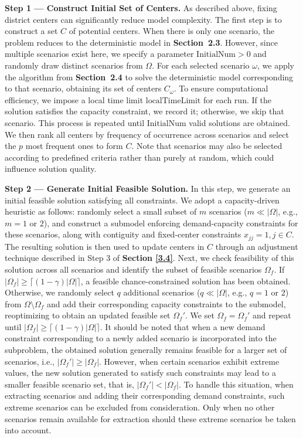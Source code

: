 \documentclass[preprint,12pt,authoryear]{elsarticle}
\begin{document}
\textbf{Step 1 — Construct Initial Set of Centers.}  
As described above, fixing district centers can significantly reduce model complexity. The first step is to construct a set $C$ of potential centers. When there is only one scenario, the problem reduces to the deterministic model in \textbf{Section~2.3}. However, since multiple scenarios exist here, we specify a parameter $\text{InitialNum} > 0$ and randomly draw distinct scenarios from $\Omega$. For each selected scenario $\omega$, we apply the algorithm from \textbf{Section~2.4} to solve the deterministic model corresponding to that scenario, obtaining its set of centers $C_\omega$. To ensure computational efficiency, we impose a local time limit $\text{localTimeLimit}$ for each run. If the solution satisfies the capacity constraint, we record it; otherwise, we skip that scenario. This process is repeated until $\text{InitialNum}$ valid solutions are obtained. We then rank all centers by frequency of occurrence across scenarios and select the $p$ most frequent ones to form $C$. Note that scenarios may also be selected according to predefined criteria rather than purely at random, which could influence solution quality.

\textbf{Step 2 — Generate Initial Feasible Solution.}  
In this step, we generate an initial feasible solution satisfying all constraints. We adopt a capacity-driven heuristic as follows: randomly select a small subset of $m$ scenarios ($m \ll |\Omega|$, e.g., $m=1$ or $2$), and construct a submodel enforcing demand-capacity constraints for these scenarios, along with contiguity and fixed-center constraints $x_{jj}=1, j\in C$. The resulting solution is then used to update centers in $C$ through an adjustment technique described in Step 3 of \textbf{Section \ref{3.4}}. Next, we check feasibility of this solution across all scenarios and identify the subset of feasible scenarios $\Omega_f$. If $|\Omega_f| \geqslant \lceil (1-\gamma)|\Omega| \rceil$, a feasible chance-constrained solution has been obtained. Otherwise, we randomly select $q$ additional scenarios ($q \ll |\Omega|$, e.g., $q=1$ or $2$) from $\Omega \setminus \Omega_f$ and add their corresponding capacity constraints to the submodel, reoptimizing to obtain an updated feasible set $\Omega_f'$. We set $\Omega_f = \Omega_f'$ and repeat until $|\Omega_f| \geqslant \lceil (1-\gamma)|\Omega| \rceil$. It should be noted that when a new demand constraint corresponding to a newly added scenario is incorporated into the subproblem, the obtained solution generally remains feasible for a larger set of scenarios, i.e.,
$
|\Omega_f'| \geqslant |\Omega_f|.
$
However, when certain scenarios exhibit extreme values, the new solution generated to satisfy such constraints may lead to a smaller feasible scenario set, that is,
$|\Omega_f'| < |\Omega_f|.$
To handle this situation, when extracting scenarios and adding their corresponding demand constraints, such extreme scenarios can be excluded from consideration. Only when no other scenarios remain available for extraction should these extreme scenarios be taken into account.
\end{document}
